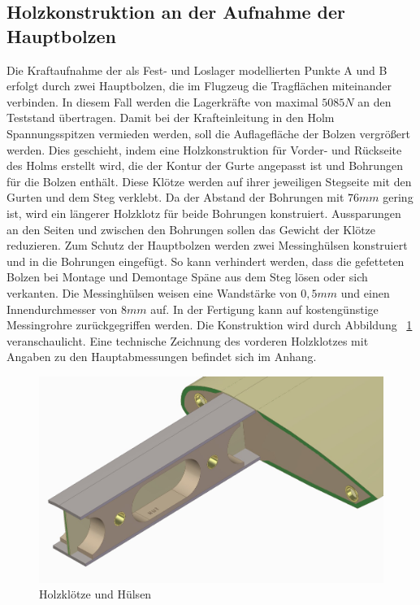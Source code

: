 \subsection{Holzkonstruktion an der Aufnahme der Hauptbolzen}
Die Kraftaufnahme der  als Fest- und Loslager modellierten Punkte A und B erfolgt durch zwei Hauptbolzen, die im Flugzeug die Tragflächen miteinander verbinden. In diesem Fall werden die Lagerkräfte von maximal $ 5085N $ an den Teststand übertragen. Damit bei der Krafteinleitung in den Holm Spannungsspitzen vermieden werden, soll die Auflagefläche der Bolzen vergrößert werden. Dies geschieht, indem eine Holzkonstruktion für Vorder- und Rückseite des Holms erstellt wird, die der Kontur der Gurte angepasst ist und Bohrungen für die Bolzen enthält. Diese Klötze werden auf ihrer jeweiligen Stegseite mit den Gurten und dem Steg verklebt. Da der Abstand der Bohrungen mit $ 76mm $ gering ist, wird ein längerer Holzklotz für beide Bohrungen konstruiert. Aussparungen an den Seiten und zwischen den Bohrungen sollen das Gewicht der Klötze reduzieren. Zum Schutz der Hauptbolzen werden zwei Messinghülsen konstruiert und in die Bohrungen eingefügt. So kann verhindert werden, dass die gefetteten Bolzen bei Montage und Demontage Späne aus dem Steg lösen oder sich verkanten. Die Messinghülsen weisen eine Wandstärke von $ 0,5mm $ und einen Innendurchmesser von $ 8mm $ auf. In der Fertigung kann auf kostengünstige Messingrohre zurückgegriffen werden. Die Konstruktion wird durch Abbildung ~\ref{fig: Klotz} veranschaulicht. Eine technische Zeichnung des vorderen Holzklotzes mit Angaben zu den Hauptabmessungen befindet sich im Anhang.
\begin{figure}[h]
	\includegraphics[width=1.0\textwidth]{Bilder/Klotz.jpg}
	\caption{Holzklötze und Hülsen}
	\label{fig: Klotz}
\end{figure}

